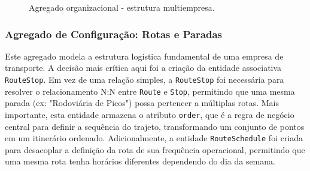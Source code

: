 \begin{figure}[H]
  \centering
  \caption{Agregado organizacional - estrutura multiempresa.}
\end{figure}

\subsubsection*{Agregado de Configuração: Rotas e Paradas}

Este agregado modela a estrutura logística fundamental de uma empresa de transporte. A decisão mais crítica aqui foi a criação da entidade associativa \texttt{RouteStop}. Em vez de uma relação simples, a \texttt{RouteStop} foi necessária para resolver o relacionamento N:N entre \texttt{Route} e \texttt{Stop}, permitindo que uma mesma parada (ex: "Rodoviária de Picos") possa pertencer a múltiplas rotas. Mais importante, esta entidade armazena o atributo \texttt{order}, que é a regra de negócio central para definir a sequência do trajeto, transformando um conjunto de pontos em um itinerário ordenado. Adicionalmente, a entidade \texttt{RouteSchedule} foi criada para desacoplar a definição da rota de sua frequência operacional, permitindo que uma mesma rota tenha horários diferentes dependendo do dia da semana.

